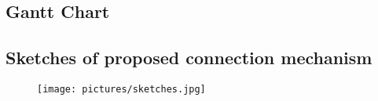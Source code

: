 \documentclass[12pt,A4]{article}
\begin{document}
	\subsection{Gantt Chart}
	
	\begin{minipage}{\linewidth}
			
	\end{minipage}
	
	\pagebreak
	
	\begin{minipage}{\linewidth}
		
	\end{minipage}
	
	\pagebreak
	
	\subsection{Sketches of proposed connection mechanism}
	
	\begin{figure}[h]
		\centering
		\texttt{[image: pictures/sketches.jpg]}
	\end{figure}
	
	\pagebreak



\end{document}
